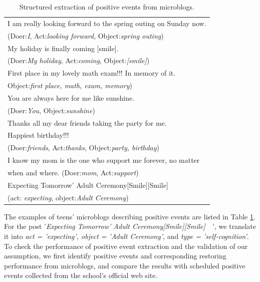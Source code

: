 \begin{table}[H]
\begin{center}
\caption{\small{Structured extraction of positive events from microblogs.}}
\small{
\begin{tabular}{l} \hline \rowcolor{gray!40}
I am really looking forward to the spring outing on Sunday now. \\ \rowcolor{gray!40}
(Doer:\emph{I}, Act:\emph{looking forward}, Object:\emph{spring outing})\\
My holiday is finally coming [smile]. \\
(Doer:\emph{My holiday}, Act:\emph{coming}, Object:\emph{[smile]})\\ \rowcolor{gray!40}%
First place in my lovely math exam!!! In memory of it.\\ \rowcolor{gray!40}
Object:\emph{first place, math, exam, memory})\\ %
You are always here for me like sunshine. \\
(Doer:\emph{You}, Object:\emph{sunshine})\\ \rowcolor{gray!40} %
Thanks all my dear friends taking the party for me. \\ \rowcolor{gray!40}
Happiest birthday!!!\\ \rowcolor{gray!40}
(Doer:\emph{friends}, Act:\emph{thanks}, Object:\emph{party, birthday})\\
I know my mom is the one who support me forever, no matter \\
when and where. (Doer:\emph{mom}, Act:\emph{support})\\ \rowcolor{gray!40}
Expecting Tomorrow' Adult Ceremony[Smile][Smile]~~\\ \rowcolor{gray!40}
(act: \emph{expecting}, object:\emph{Adult Ceremony})\\ \hline
\end{tabular}}
\label{tab:uplifts}
\end{center}
\end{table}

The examples of teens' microblogs describing positive events are listed in Table \ref{tab:uplifts}.
For the post '\emph{Expecting Tomorrow' Adult Ceremony[Smile][Smile]~~}',
we translate it into \emph{act = 'expecting', object = 'Adult Ceremony'},
and \emph{type = 'self-cognition'}.
To check the performance of positive event extraction and the validation of our assumption,
we first identify positive events and corresponding restoring performance from microblogs,
and compare the results with scheduled positive events collected from the school's official web site.


